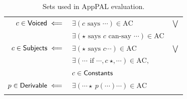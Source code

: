 \documentclass[thesis.tex]{subfiles}
\begin{document}
\begin{table}
  \centering
  \newcommand{\myset}[1]{\ensuremath{\text{\sffamily #1}}}
  \begin{tabular}{r l c}
    \toprule
    $c \in \myset{Voiced} \impliedby$     & $\exists \left(c \text{~says~} \cdots\right) \in \text{AC}$                        & $\bigvee$ \\
                                          & $\exists \left(\star \text{~says~} c \text{~can-say~} \cdots\right) \in \text{AC}$ &           \\
    $c \in \myset{Subjects} \impliedby$   & $\exists \left(\star \text{~says~} c\cdots\right) \in \text{AC}$                   & $\bigvee$ \\
                                          & $\exists \left(\cdots \text{~if~} \cdots,c~\star,\cdots\right) \in \text{AC},$     &           \\
                                          & $c \in \myset{Constants}$                                                          &           \\
    $p \in \myset{Derivable} \impliedby$  & $\exists \left( \cdots \star~p\left(\cdots\right) \cdots\right) \in \text{AC}$     &           \\
    \bottomrule                          \\
  \end{tabular}
  \caption{Sets used in AppPAL evaluation.}
  \label{tab:apppal-sets}
\end{table}
\end{document}

